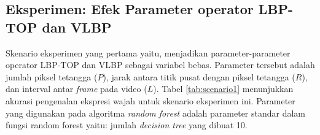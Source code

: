 \documentclass[review,3p,12pt,times]{elsarticle}
\begin{document}
\subsection{Eksperimen: Efek Parameter operator LBP-TOP dan VLBP}
\label{scenario1}

Skenario eksperimen yang pertama yaitu, menjadikan parameter-parameter operator LBP-TOP dan VLBP sebagai variabel bebas. Parameter tersebut adalah jumlah piksel tetangga ($P$), jarak antara titik pusat dengan piksel tetangga ($R$), dan interval antar \textit{frame} pada video ($L$). Tabel \ref{tab:scenario1} menunjukkan akurasi pengenalan ekspresi wajah untuk skenario eksperimen ini. Parameter yang digunakan pada algoritma \textit{random forest} adalah parameter standar dalam fungsi random forest yaitu: jumlah \textit{decision tree} yang dibuat 10.
\end{document}
